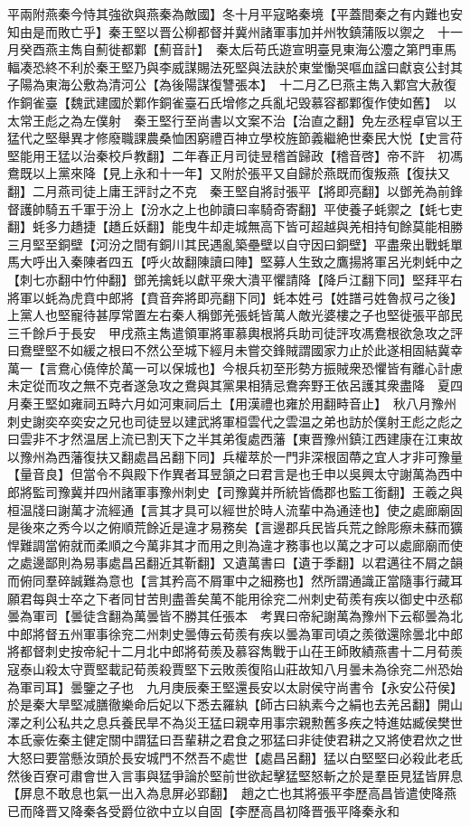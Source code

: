 平兩附燕秦今恃其強欲與燕秦為敵國】冬十月平寇略秦境【平蓋間秦之有内難也安知由是而敗亡乎】秦王堅以晋公柳都督并冀州諸軍事加并州牧鎮蒲阪以禦之　十一月癸酉燕主雋自薊徙都鄴【薊音計】　秦太后苟氏遊宣明臺見東海公灋之第門車馬輻凑恐終不利於秦王堅乃與李威謀賜法死堅與法訣於東堂慟哭嘔血諡曰獻哀公封其子陽為東海公敷為清河公【為後陽謀復讐張本】　十二月乙巳燕主雋入鄴宫大赦復作銅雀臺【魏武建國於鄴作銅雀臺石氏增修之兵亂圮毁慕容都鄴復作使如舊】　以太常王彪之為左僕射　秦王堅行至尚書以文案不治【治直之翻】免左丞程卓官以王猛代之堅舉異才修廢職課農桑恤困窮禮百神立學校旌節義繼絶世秦民大悦【史言苻堅能用王猛以治秦校戶教翻】二年春正月司徒昱稽首歸政【稽音啓】帝不許　初馮鴦既以上黨來降【見上永和十一年】又附於張平又自歸於燕既而復叛燕【復扶又翻】二月燕司徒上庸王評討之不克　秦王堅自將討張平【將即亮翻】以鄧羌為前鋒督護帥騎五千軍于汾上【汾水之上也帥讀曰率騎奇寄翻】平使養子蚝禦之【蚝七吏翻】蚝多力趫捷【趫丘妖翻】能曳牛却走城無高下皆可超越與羌相持旬餘莫能相勝三月堅至銅壁【河汾之間有銅川其民遇亂築壘壁以自守因曰銅壁】平盡衆出戰蚝單馬大呼出入秦陳者四五【呼火故翻陳讀曰陣】堅募人生致之鷹揚將軍呂光刺蚝中之【刺七亦翻中竹仲翻】鄧羌擒蚝以獻平衆大潰平懼請降【降戶江翻下同】堅拜平右將軍以蚝為虎賁中郎將【賁音奔將即亮翻下同】蚝本姓弓【姓譜弓姓魯叔弓之後】上黨人也堅寵待甚厚常置左右秦人稱鄧羌張蚝皆萬人敵光婆樓之子也堅徙張平部民三千餘戶于長安　甲戌燕主雋遣領軍將軍慕輿根將兵助司徒評攻馮鴦根欲急攻之評曰鴦壁堅不如緩之根曰不然公至城下經月未嘗交鋒賊謂國家力止於此遂相固結冀幸萬一【言鴦心僥倖於萬一可以保城也】今根兵初至形勢方振賊衆恐懼皆有離心計慮未定從而攻之無不克者遂急攻之鴦與其黨果相猜忌鴦奔野王依呂護其衆盡降　夏四月秦王堅如雍祠五畤六月如河東祠后土【用漢禮也雍於用翻畤音止】　秋八月豫州刺史謝奕卒奕安之兄也司徒昱以建武將軍桓雲代之雲温之弟也訪於僕射王彪之彪之曰雲非不才然温居上流已割天下之半其弟復處西藩【東晋豫州鎮江西建康在江東故以豫州為西藩復扶又翻處昌呂翻下同】兵權萃於一門非深根固蔕之宜人才非可豫量【量音良】但當令不與殿下作異者耳昱頷之曰君言是也壬申以吳興太守謝萬為西中郎將監司豫冀并四州諸軍事豫州刺史【司豫冀并所統皆僑郡也監工銜翻】王羲之與桓温牋曰謝萬才流經通【言其才具可以經世於時人流輩中為通逹也】使之處廊廟固是後來之秀今以之俯順荒餘近是違才易務矣【言邊郡兵民皆兵荒之餘彫瘵未蘇而獷悍難調當俯就而柔順之今萬非其才而用之則為違才務事也以萬之才可以處廊廟而使之處邊鄙則為易事處昌呂翻近其靳翻】又遺萬書曰【遺于季翻】以君邁往不屑之韻而俯同羣碎誠難為意也【言其矜高不屑軍中之細務也】然所謂通識正當隨事行藏耳願君每與士卒之下者同甘苦則盡善矣萬不能用徐兖二州刺史荀羨有疾以御史中丞郗曇為軍司【曇徒含翻為萬曇皆不勝其任張本　考異曰帝紀謝萬為豫州下云郗曇為北中郎將督五州軍事徐兖二州刺史曇傳云荀羨有疾以曇為軍司頃之羨徵還除曇北中郎將都督刺史按帝紀十二月北中郎將荀羨及慕容雋戰于山茌王師敗績燕書十二月荀羨寇泰山殺太守賈堅載記荀羨殺賈堅下云敗羨復陷山莊故知八月曇未為徐兖二州恐始為軍司耳】曇鑒之子也　九月庚辰秦王堅還長安以太尉侯守尚書令【永安公苻侯】於是秦大旱堅减膳徹樂命后妃以下悉去羅紈【師古曰紈素今之絹也去羌呂翻】開山澤之利公私共之息兵養民旱不為災王猛曰親幸用事宗親勲舊多疾之特進姑臧侯樊世本氐豪佐秦主健定關中謂猛曰吾輩耕之君食之邪猛曰非徒使君耕之又將使君炊之世大怒曰要當懸汝頭於長安城門不然吾不處世【處昌呂翻】猛以白堅堅曰必殺此老氐然後百寮可肅會世入言事與猛爭論於堅前世欲起擊猛堅怒斬之於是羣臣見猛皆屛息【屏息不敢息也氣一出入為息屏必郢翻】　趙之亡也其將張平李歷高昌皆遣使降燕已而降晋又降秦各受爵位欲中立以自固【李歷高昌初降晋張平降秦永和